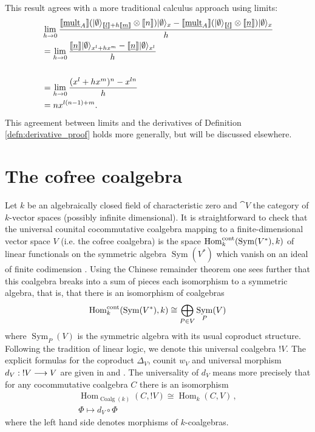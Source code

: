 \documentclass[english,letter paper,12pt,reqno]{article}
\DeclarePairedDelimiter\ket{\lvert}{\rangle}
\theoremstyle{example}
\def\Hom{\operatorname{Hom}}
\def\vacu{\ket{\emptyset}}
\def\be{\begin{equation}}
\def\ee{\end{equation}}
\DeclareMathOperator{\Sym}{Sym}
\begin{document}
This result agrees with a more traditional calculus approach using limits:
\begin{align*}
&\lim_{h \to 0} \frac{\den{\mult_A}(\vacu_{\den{\underline{l}} + h \den{\underline{m}}} \otimes \den{n})\vacu_x  - \den{\mult_A}(\vacu_{\den{\underline{l}}} \otimes \den{\underline{n}})\vacu_x}{h}\\
&= \lim_{h \to 0} \frac{\den{\underline{n}}\vacu_{x^l + h x^m} - \den{\underline{n}}\vacu_{x^l}}{h} \\
\\&= \lim_{h \to 0} \frac{(x^l + h x^m)^n - x^{ln}}{h} 
\\&= nx^{l(n-1)+m}.
\end{align*}
This agreement between limits and the derivatives of Definition \ref{defn:derivative_proof} holds more generally, but will be discussed elsewhere.
\appendix

\section{The cofree coalgebra}\label{section:background}

Let $k$ be an algebraically closed field of characteristic zero and $\cat{V}$ the category of $k$-vector spaces (possibly infinite dimensional). It is straightforward to check that the universal counital cocommutative coalgebra mapping to a finite-dimensional vector space $V$ (i.e. the cofree coalgebra) is the space $\Hom_k^{\cont}(\Sym(V^*),k)$ of linear functionals on the symmetric algebra $\Sym(V^*)$ which vanish on an ideal of finite codimension \cite{hyland}. Using the Chinese remainder theorem one sees further that this coalgebra breaks into a sum of pieces each isomorphism to a symmetric algebra, that is, that there is an isomorphism of coalgebras
\be\label{eq:isocontnu}
\Hom_k^{\cont}(\Sym(V^*),k) \cong \bigoplus_{P \in V} \Sym_P(V)
\ee
where $\Sym_P(V)$ is the symmetric algebra with its usual coproduct structure. Following the tradition of linear logic, we denote this universal coalgebra ${!} V$. The explicit formulas for the coproduct $\Delta_V$, counit $w_V$ and universal morphism $d_V: {!} V \longrightarrow V$ are given in \cite{murfet_coalg} and \cite[\S 5.2]{murfet_ll}. The universality of $d_V$ means more precisely that for any cocommutative coalgebra $C$ there is an isomorphism
\begin{gather*}
\Hom_{\operatorname{Coalg}(k)}(C, {!} V) \cong \Hom_{k}(C, V)\,,\\
\Phi \longmapsto d_V \circ \Phi
\end{gather*}
where the left hand side denotes morphisms of $k$-coalgebras.
\end{document}
